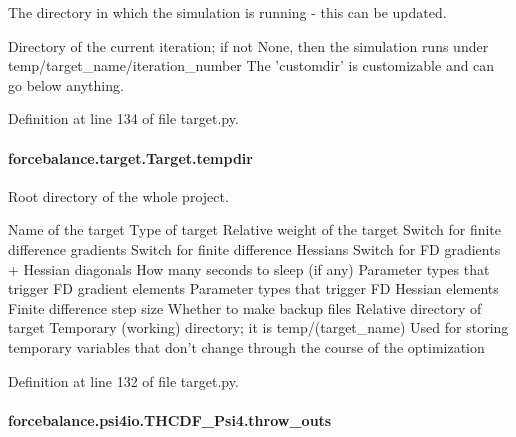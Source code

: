 The directory in which the simulation is running -\/ this can be updated. 

Directory of the current iteration; if not None, then the simulation runs under temp/target\-\_\-name/iteration\-\_\-number The 'customdir' is customizable and can go below anything.

Definition at line 134 of file target.\-py.

\hypertarget{classforcebalance_1_1target_1_1Target_aa1f01b5b78db253b5b66384ed11ed193}{
\paragraph[{tempdir}]{\setlength{\rightskip}{0pt plus 5cm}forcebalance.\-target.\-Target.\-tempdir\hspace{0.3cm}{\ttfamily [inherited]}}}\label{classforcebalance_1_1target_1_1Target_aa1f01b5b78db253b5b66384ed11ed193}


Root directory of the whole project. 

Name of the target Type of target Relative weight of the target Switch for finite difference gradients Switch for finite difference Hessians Switch for F\-D gradients + Hessian diagonals How many seconds to sleep (if any) Parameter types that trigger F\-D gradient elements Parameter types that trigger F\-D Hessian elements Finite difference step size Whether to make backup files Relative directory of target Temporary (working) directory; it is temp/(target\-\_\-name) Used for storing temporary variables that don't change through the course of the optimization 

Definition at line 132 of file target.\-py.

\hypertarget{classforcebalance_1_1psi4io_1_1THCDF__Psi4_a2325dfcc249e17fce558eaff4ed2f7f1}{
\paragraph[{throw\-\_\-outs}]{\setlength{\rightskip}{0pt plus 5cm}forcebalance.\-psi4io.\-T\-H\-C\-D\-F\-\_\-\-Psi4.\-throw\-\_\-outs}}\label{classforcebalance_1_1psi4io_1_1THCDF__Psi4_a2325dfcc249e17fce558eaff4ed2f7f1}


